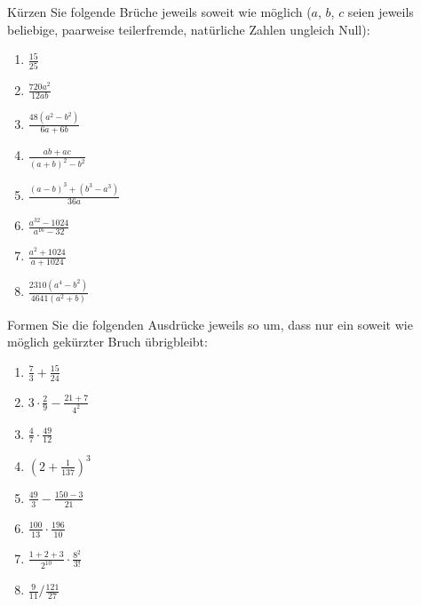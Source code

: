 Kürzen Sie folgende Brüche jeweils soweit wie möglich ($a$, $b$, $c$ seien jeweils beliebige, paarweise teilerfremde, natürliche Zahlen ungleich Null):\\
\parbox{0.5\textwidth}{\begin{enumerate}
\item $\frac{15}{25}$
\item $\frac{720a^2}{12ab}$
\item $\frac{48(a^2-b^2)}{6a+6b}$
\item $\frac{ab+ac}{(a+b)^2-b^2}$
\end{enumerate}}\parbox{0.5\textwidth}{\begin{enumerate}\setcounter{enumi}{4}
\item $\frac{(a-b)^3+(b^3-a^3)}{36a}$
\item $\frac{a^{32}-1024}{a^{16}-32}$
\item $\frac{a^2+1024}{a+1024}$
\item $\frac{2310(a^4-b^2)}{4641(a^2+b)}$
\end{enumerate}}



Formen Sie die folgenden Ausdrücke jeweils so um, dass nur ein soweit wie möglich gekürzter Bruch übrigbleibt:\\
\parbox{0.5\textwidth}{\begin{enumerate}
\item $\frac{7}{3}+\frac{15}{24}$
\item $3\cdot\frac{2}{9}-\frac{21+7}{4^2}$
\item $\frac{4}{7}\cdot\frac{49}{12}$
\item $\left(2+\frac{1}{137}\right)^3$
\end{enumerate}}\parbox{0.5\textwidth}{\begin{enumerate}\setcounter{enumi}{4}
\item $\frac{49}{3}-\frac{150-3}{21}$
\item $\frac{100}{13}\cdot\frac{196}{10}$
\item $\frac{1+2+3}{2^{10}}\cdot\frac{8^2}{3!}$
\item $\frac{9}{11}/\frac{121}{27}$
\end{enumerate}}




